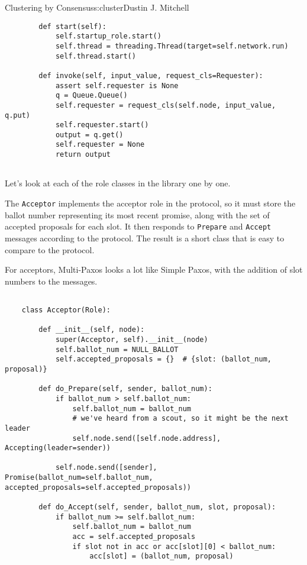 \begin{aosachapter}{Clustering by Consensus}{s:cluster}{Dustin J. Mitchell}
\begin{verbatim}
        def start(self):
            self.startup_role.start()
            self.thread = threading.Thread(target=self.network.run)
            self.thread.start()
    
        def invoke(self, input_value, request_cls=Requester):
            assert self.requester is None
            q = Queue.Queue()
            self.requester = request_cls(self.node, input_value, q.put)
            self.requester.start()
            output = q.get()
            self.requester = None
            return output
    
\end{verbatim}

\label{role-classes}

Let's look at each of the role classes in the library one by one.

\label{acceptor}

The \texttt{Acceptor} implements the acceptor role in the protocol, so
it must store the ballot number representing its most recent promise,
along with the set of accepted proposals for each slot. It then responds
to \texttt{Prepare} and \texttt{Accept} messages according to the
protocol. The result is a short class that is easy to compare to the
protocol.

For acceptors, Multi-Paxos looks a lot like Simple Paxos, with the
addition of slot numbers to the messages.

\begin{verbatim}

    class Acceptor(Role):
    
        def __init__(self, node):
            super(Acceptor, self).__init__(node)
            self.ballot_num = NULL_BALLOT
            self.accepted_proposals = {}  # {slot: (ballot_num, proposal)}
    
        def do_Prepare(self, sender, ballot_num):
            if ballot_num > self.ballot_num:
                self.ballot_num = ballot_num
                # we've heard from a scout, so it might be the next leader
                self.node.send([self.node.address], Accepting(leader=sender))
    
            self.node.send([sender], Promise(ballot_num=self.ballot_num, accepted_proposals=self.accepted_proposals))
    
        def do_Accept(self, sender, ballot_num, slot, proposal):
            if ballot_num >= self.ballot_num:
                self.ballot_num = ballot_num
                acc = self.accepted_proposals
                if slot not in acc or acc[slot][0] < ballot_num:
                    acc[slot] = (ballot_num, proposal)
    

\end{verbatim}
\end{aosachapter}
